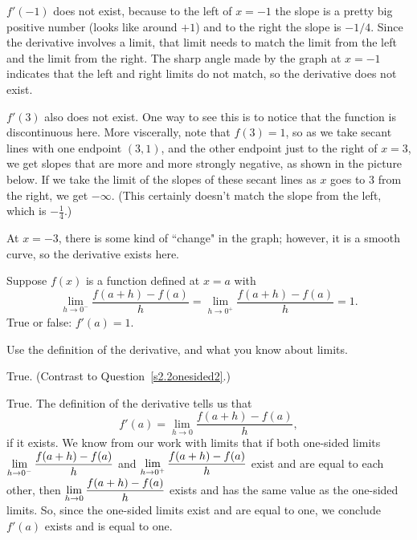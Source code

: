 \begin{solution}
$f'(-1)$ does not exist, because to the left of $x=-1$ the slope is a pretty big positive number (looks like around $+1$) and to the right the slope is $-1/4$. Since the derivative involves a limit, that limit needs to match the limit from the left and the limit from the right. The sharp angle made by the graph at $x=-1$ indicates that the left and right limits do not match, so the derivative does not exist.

$f'(3)$ also does not exist.  One way to see this is to notice that the function is discontinuous here. More viscerally, note that $f(3)=1$, so as we take secant lines with one endpoint $(3,1)$, and the other endpoint just to the right of $x=3$, we get slopes that are more and more strongly negative, as shown in the picture below. If we take the limit of the slopes of these secant lines as $x$ goes to $3$ from the right, we get $-\infty$. (This certainly doesn't match the slope from the left, which is $-\frac{1}{4}$.)
\begin{center}
\end{center}

At $x=-3$, there is some kind of ``change" in the graph; however, it is a smooth curve, so the derivative exists here.
\end{solution}


\begin{Mquestion}\label{s2.2onesided1}
Suppose $f(x)$ is a function defined at $x=a$ with \[\lim_{h \to 0^-}\frac{f(a+h)-f(a)}{h}=\lim_{h \to 0^+}\frac{f(a+h)-f(a)}{h}=1.\] True or false: $f'(a)=1$.
\end{Mquestion}
\begin{hint} Use the definition of the derivative, and what you know about limits.
\end{hint}
\begin{answer} True. (Contrast to Question~\ref{s2.2onesided2}.)
\end{answer}
\begin{solution}
True.
The definition of the derivative tells us that
\[f'(a) = \lim_{h \to 0}\dfrac{f(a+h)-f(a)}{h},\] if it exists. We know from our work with limits that if both one-sided limits\\
$\displaystyle\lim_{h \to 0^-}\frac{f(a+h)-f(a)}{h}$ and $\displaystyle\lim_{h \to 0^+}\frac{f(a+h)-f(a)}{h}$ exist and are equal to each other, then $\displaystyle \lim_{h \to 0}\dfrac{f(a+h)-f(a)}{h}$ exists and has the same value as the one-sided limits. So, since the one-sided limits exist and are equal to one, we conclude $f'(a)$ exists and is equal to one.
\end{solution}

